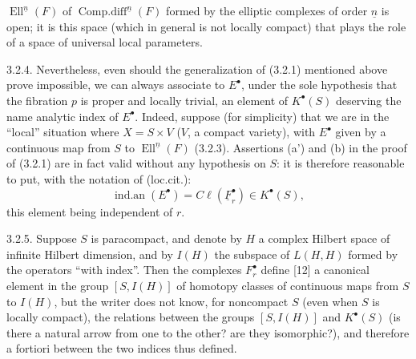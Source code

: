 %
$\operatorname{Ell}^{\underline n}(F)$ of
$\operatorname{Comp.diff}^{\underline n}(F)$ formed by the elliptic complexes of order $\underline n$ is open; it is this space (which in general is not locally compact) that plays the role of a space of universal local parameters.

3.2.4. Nevertheless, even should the generalization of (3.2.1) mentioned above prove impossible, we can always associate to $E^\bullet$, under the sole hypothesis that the fibration $p$ is proper and locally trivial, an element of $K^\bullet(S)$ deserving the name analytic index of $E^\bullet$. Indeed, suppose (for simplicity) that we are in the \textquotedblleft local\textquotedblright{} situation where $X=S\times V$ ($V$, a compact variety), with $E^\bullet$ given by a continuous map from $S$ to $\operatorname{Ell}^{\underline n}(F)$ (3.2.3). Assertions (a') and (b) in the proof of (3.2.1) are in fact valid without any hypothesis on $S$: it is therefore reasonable to put, with the notation of (loc.cit.):
\[
  \operatorname{ind.an}(E^\bullet)=C\ell(\underline F_r^\bullet)\in K^\bullet(S),
\]
this element being independent of $r$.

3.2.5. Suppose $S$ is paracompact, and denote by $H$ a complex Hilbert space of infinite Hilbert dimension, and by $I(H)$ the subspace of $L(H,H)$ formed by the operators \textquotedblleft with index\textquotedblright{}. Then the complexes $F_r^\bullet$ define [12] a canonical element in the group $[S,I(H)]$ of homotopy classes of continuous maps from $S$ to $I(H)$, but the writer does not know, for noncompact $S$ (even when $S$ is locally compact), the relations between the groups $[S,I(H)]$ and $K^\bullet(S)$ (is there a natural arrow from one to the other? are they isomorphic?), and therefore a fortiori between the two indices thus defined.

